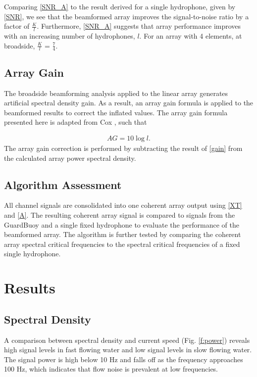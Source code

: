 \documentclass[12pt,journal,onecolumn]{IEEEtran}
\begin{document}
Comparing \eqref{SNR_A} to the result derived for a single hydrophone, given by \eqref{SNR}, we see that the beamformed array improves the signal-to-noise ratio by a factor of $\frac{K}{l}$. Furthermore, \eqref{SNR_A} suggests that array performance improves with an increasing number of hydrophones, $l$. For an array with 4 elements, at broadside, $\frac{K}{l}$ = $\frac{7}{4}$.



\subsection{Array Gain}
The broadside beamforming analysis applied to the linear array generates artificial spectral density gain. As a result, an array gain formula is applied to the beamformed results to correct the inflated values. The array gain formula presented here is adapted from Cox \cite{cox}, such that

\begin{align}
AG = 10 \log l.
\label{gain}
\end{align}
The array gain correction is performed by subtracting the result of \eqref{gain} from the calculated array power spectral density.
\subsection{Algorithm Assessment}
All channel signals are consolidated into one coherent array output using \eqref{XT} and \eqref{A}. The resulting coherent array signal is compared to signals from the GuardBuoy and a single fixed hydrophone to evaluate the performance of the beamformed array. The algorithm is further tested by comparing the coherent array spectral critical frequencies  to the spectral critical frequencies of a fixed single hydrophone. 

\section{Results}
\label{IV}



\subsection{Spectral Density}

A comparison between spectral density and current speed (Fig. \ref{f:power}) reveals high signal levels in fast flowing water and low signal levels in slow flowing water. The signal power is high below 10 Hz and falls off as the frequency approaches 100 Hz, which indicates that flow noise is prevalent at low frequencies. 
\end{document}
